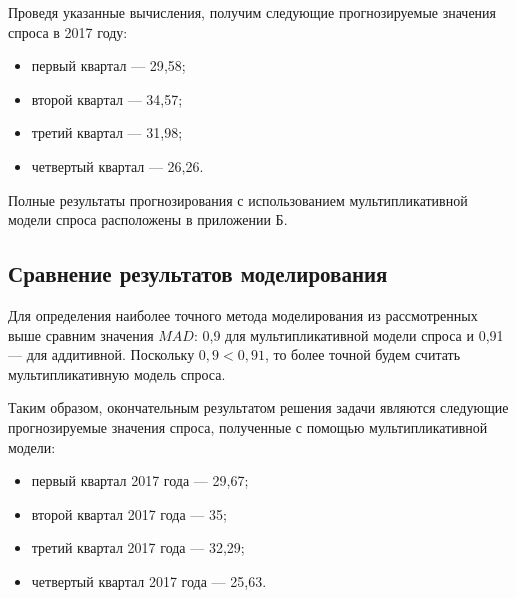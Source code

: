 Проведя указанные вычисления, получим следующие прогнозируемые значения
спроса в 2017 году:

\begin{itemize}
\item первый квартал --- 29{,}58;
\item второй квартал --- 34{,}57;
\item третий квартал --- 31{,}98;
\item четвертый квартал --- 26{,}26.
\end{itemize}

Полные результаты прогнозирования с использованием мультипликативной
модели спроса расположены в приложении Б.


\subsection{Сравнение результатов моделирования}

Для определения наиболее точного метода моделирования из рассмотренных
выше сравним значения \( MAD \):
0{,}9 для мультипликативной модели спроса и
0{,}91 --- для аддитивной.
Поскольку \( 0{,}9 < 0{,}91 \), то более точной будем считать мультипликативную модель спроса.

Таким образом, окончательным результатом решения задачи являются следующие
прогнозируемые значения спроса,
полученные с помощью мультипликативной модели:

\begin{itemize}
\item первый квартал 2017 года --- 29{,}67;
\item второй квартал 2017 года --- 35;
\item третий квартал 2017 года --- 32{,}29;
\item четвертый квартал 2017 года --- 25{,}63.
\end{itemize}
